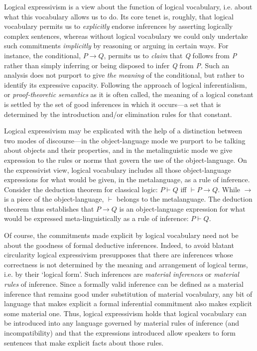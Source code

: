 \documentclass{article}
\begin{document}
Logical expressivism is a view about the function of logical vocabulary, i.e. about what this vocabulary allows us to do. Its core tenet is, roughly, that logical vocabulary permits us to \textit{explicitly} endorse inferences by asserting logically complex sentences, whereas without logical vocabulary we could only undertake such commitments \textit{implicitly} by reasoning or arguing in certain ways. For instance, the conditional, $ P  \rightarrow  Q$, permits us to \textit{claim} that \textit{Q} follows from \textit{P} rather than simply inferring or being disposed to infer \textit{Q} from \textit{P}. Such an analysis does not purport to give \textit{the meaning} of the conditional, but rather to identify its expressive capacity. Following the approach of logical inferentialism, or \textit{proof-theoretic semantics} as it is often called, the meaning of a logical constant is settled by the set of good inferences in which it occurs---a set that is determined by the introduction and/or elimination rules for that constant.

Logical expressivism may be explicated with the help of a distinction between two modes of discourse---in the object-language mode we purport to be talking about objects and their properties, and in the metalinguistic mode we give expression to the rules or norms that govern the use of the object-language. On the expressivist view, logical vocabulary includes all those object-language expressions for what would be given, in the metalanguage, as a rule of inference. Consider the deduction theorem for classical logic: $ P \vdash Q $ iff $ \vdash P \rightarrow Q $. While $ \rightarrow $ is a piece of the object-language, $ \vdash $ belongs to the metalanguage. The deduction theorem thus establishes that $ P \rightarrow Q $ is an object-language expression for what would be expressed meta-linguistically as a rule of inference: $ P \vdash Q $.

Of course, the commitments made explicit by logical vocabulary need not be about the goodness of formal deductive inferences. Indeed, to avoid blatant circularity logical expressivism presupposes that there are inferences whose correctness is not determined by the meaning and arrangement of logical terms, i.e. by their `logical form'. Such inferences are \textit{material inferences} or \textit{material rules} of inference.  Since a formally valid inference can be defined as a material inference that remains good under substitution of material vocabulary, any bit of language that makes explicit a formal inferential commitment also makes explicit some material one. Thus, logical expressivism holds that logical vocabulary can be introduced into any language governed by material rules of inference (and incompatibility) and that the expressions introduced allow speakers to form sentences that make explicit facts about those rules.
\end{document}
